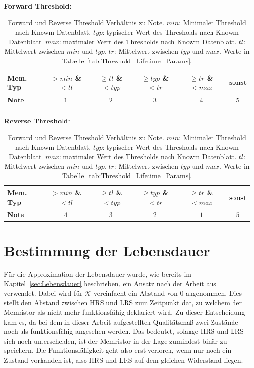\begin{table}
  \centering
    \textbf{Forward Threshold:}
    \begin{tabular}{l|c|c|c|c|c}
      \textbf{Mem. Typ} & $> min$ \& $ < tl$ & $\geq tl$ \& $< typ$ & $\geq typ$ \& $< tr$ & $\geq tr$ \& $< max$ & sonst \\\hline
      \textbf{Note}     & $1$                   & $2$                  & $3$                  & $4$                  & $5$  \\\\
    \end{tabular}
    \textbf{Reverse Threshold:}
    \begin{tabular}{l|c|c|c|c|c}
      \textbf{Mem. Typ} & $> min$ \& $ < tl$ & $\geq tl$ \& $< typ$ & $\geq typ$ \& $< tr$ & $\geq tr$ \& $< max$ & sonst \\\hline
      \textbf{Note}     & $4$                   & $3$                  & $2$                  & $1$                  & $5$
    \end{tabular}
  \caption{Forward und Reverse Threshold Verhältnis zu Note. $min$: Minimaler Threshold nach Knowm Datenblatt\cite{knowm_comp_2019}. $typ$: typischer Wert des Thresholds nach Knowm Datenblatt. $max$: maximaler Wert des Thresholds nach Knowm Datenblatt. $tl$: Mittelwert zwischen $min$ und $typ$. $tr$: Mittelwert zwischen $typ$ und $max$. Werte in Tabelle~\ref{tab:Threshold_Lifetime_Params}.}
  \label{tab:Thresholdnote}
\end{table}


\section{Bestimmung der Lebensdauer}
Für die Approximation der Lebensdauer wurde, wie bereits im Kapitel~\ref{sec:Lebensdauer} beschrieben, ein Ansatz nach der Arbeit aus~\cite{stat_lifetime} verwendet. Dabei wird für $\mathcal{K}$ vereinfacht ein Abstand von 0 angenommen. Dies stellt den Abstand zwischen HRS und LRS zum Zeitpunkt dar, zu welchem der Memristor als nicht mehr funktionsfähig deklariert wird. Zu dieser Entscheidung kam es, da bei dem in dieser Arbeit aufgestellten Qualitätsmaß zwei Zustände noch als funktionsfähig angesehen werden. Das bedeutet, solange HRS und LRS sich noch unterscheiden, ist der Memristor in der Lage zumindest binär zu speichern. Die Funktionsfähigkeit geht also erst verloren, wenn nur noch ein Zustand vorhanden ist, also HRS und LRS auf dem gleichen Widerstand liegen.

